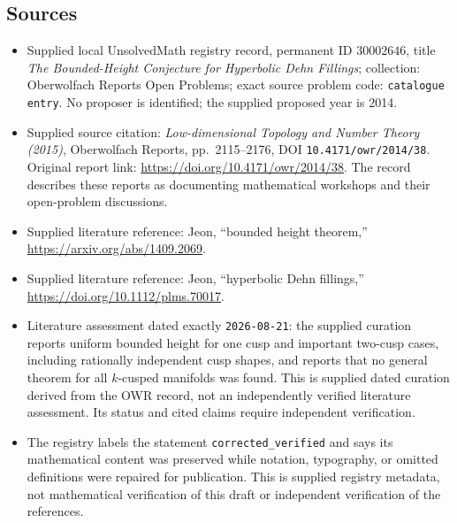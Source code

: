 \documentclass[11pt]{article}
\begin{document}
\subsection{Sources}
\begin{itemize}
\item Supplied local UnsolvedMath registry record, permanent ID \(30002646\), title \emph{The Bounded-Height Conjecture for Hyperbolic Dehn Fillings}; collection: Oberwolfach Reports Open Problems; exact source problem code: \texttt{catalogue entry}. No proposer is identified; the supplied proposed year is 2014.
\item Supplied source citation: \emph{Low-dimensional Topology and Number Theory (2015)}, Oberwolfach Reports, pp.\ 2115--2176, DOI \texttt{10.4171/owr/2014/38}. Original report link: \url{https://doi.org/10.4171/owr/2014/38}. The record describes these reports as documenting mathematical workshops and their open-problem discussions.
\item Supplied literature reference: Jeon, ``bounded height theorem,'' \url{https://arxiv.org/abs/1409.2069}.
\item Supplied literature reference: Jeon, ``hyperbolic Dehn fillings,'' \url{https://doi.org/10.1112/plms.70017}.
\item Literature assessment dated exactly \texttt{2026-08-21}: the supplied curation reports uniform bounded height for one cusp and important two-cusp cases, including rationally independent cusp shapes, and reports that no general theorem for all \(k\)-cusped manifolds was found. This is supplied dated curation derived from the OWR record, not an independently verified literature assessment. Its status and cited claims require independent verification.
\item The registry labels the statement \texttt{corrected\_verified} and says its mathematical content was preserved while notation, typography, or omitted definitions were repaired for publication. This is supplied registry metadata, not mathematical verification of this draft or independent verification of the references.
\end{itemize}
\end{document}
